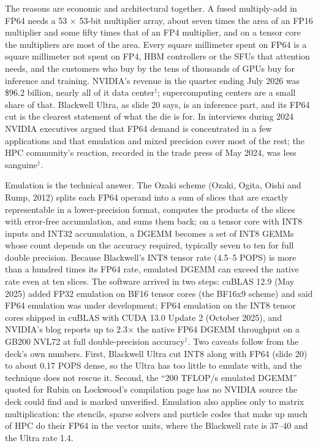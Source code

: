 \documentclass[11pt,letterpaper]{article}
\begin{document}
The reasons are economic and architectural together. A fused multiply-add in FP64 needs a 53 $\times$ 53-bit multiplier array, about seven times the area of an FP16 multiplier and some fifty times that of an FP4 multiplier, and on a tensor core the multipliers are most of the area. Every square millimeter spent on FP64 is a square millimeter not spent on FP4, HBM controllers or the SFUs that attention needs, and the customers who buy by the tens of thousands of GPUs buy for inference and training. NVIDIA's revenue in the quarter ending July 2026 was \$96.2 billion, nearly all of it data center$^\dagger$; supercomputing centers are a small share of that. Blackwell Ultra, as slide 20 says, is an inference part, and its FP64 cut is the clearest statement of what the die is for. In interviews during 2024 NVIDIA executives argued that FP64 demand is concentrated in a few applications and that emulation and mixed precision cover most of the rest; the HPC community's reaction, recorded in the trade press of May 2024, was less sanguine$^\dagger$.

Emulation is the technical answer. The Ozaki scheme (Ozaki, Ogita, Oishi and Rump, 2012) splits each FP64 operand into a sum of slices that are exactly representable in a lower-precision format, computes the products of the slices with error-free accumulation, and sums them back; on a tensor core with INT8 inputs and INT32 accumulation, a DGEMM becomes a set of INT8 GEMMs whose count depends on the accuracy required, typically seven to ten for full double precision. Because Blackwell's INT8 tensor rate (4.5--5 POPS) is more than a hundred times its FP64 rate, emulated DGEMM can exceed the native rate even at ten slices. The software arrived in two steps: cuBLAS 12.9 (May 2025) added FP32 emulation on BF16 tensor cores (the BF16x9 scheme) and said FP64 emulation was under development; FP64 emulation on the INT8 tensor cores shipped in cuBLAS with CUDA 13.0 Update 2 (October 2025), and NVIDIA's blog reports up to 2.3$\times$ the native FP64 DGEMM throughput on a GB200 NVL72 at full double-precision accuracy$^\dagger$. Two caveats follow from the deck's own numbers. First, Blackwell Ultra cut INT8 along with FP64 (slide 20) to about 0.17 POPS dense, so the Ultra has too little to emulate with, and the technique does not rescue it. Second, the ``200 TFLOP/s emulated DGEMM'' quoted for Rubin on Lockwood's compilation page has no NVIDIA source the deck could find and is marked unverified. Emulation also applies only to matrix multiplication: the stencils, sparse solvers and particle codes that make up much of HPC do their FP64 in the vector units, where the Blackwell rate is 37--40 and the Ultra rate 1.4.
\end{document}

